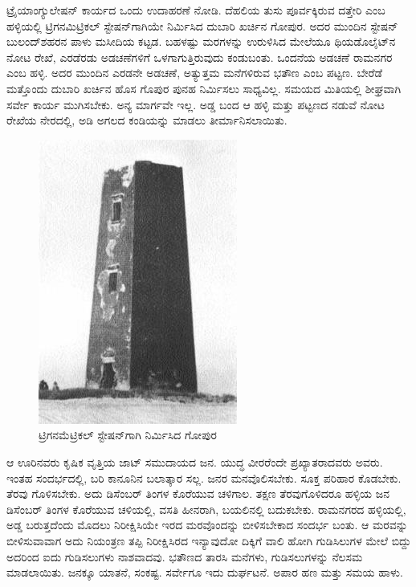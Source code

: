 ಟ್ರೈಯಾಂಗ್ಯುಲೇಷನ್​ ಕಾರ್ಯದ ಒಂದು ಉದಾಹರಣೆ ನೋಡಿ. ದೆಹಲಿಯ ತುಸು ಪೂರ್ವಕ್ಕಿರುವ ದತ್ತೇರಿ ಎಂಬ ಹಳ್ಳಿಯಲ್ಲಿ ಟ್ರಿಗನಮಿಟ್ರಿಕಲ್​ ಸ್ಟೇಷನ್​ಗಾಗಿಯೇ ನಿರ್ಮಿಸಿದ ದುಬಾರಿ ಖರ್ಚಿನ ಗೋಪುರ. ಅದರ ಮುಂದಿನ ಸ್ಟೇಷನ್​ ಬುಲಂದ್​ಶಹರನ ಪಾಳು ಮಸೀದಿಯ ಕಟ್ಟಡ. ಬಹಳಷ್ಟು ಮರಗಳನ್ನು ಉರುಳಿಸಿದ ಮೇಲೆಯೂ ಥಿಯಡೊಲೈಟ್​ನ ನೋಟ ರೇಖೆ, ಎರಡೆರಡು ಅಡಚಣೆಗಳಿಗೆ ಒಳಗಾಗುತ್ತಿರುವುದು ಕಂಡುಬಂತು. ಒಂದನೆಯ ಅಡಚಣೆ ರಾಮನಗರ ಎಂಬ ಹಳ್ಳಿ. ಅದರ ಮುಂದಿನ ಎರಡನೇ ಅಡಚಣೆ, ಅತ್ಯುತ್ತಮ ಮನೆಗಳಿರುವ ಭತೌಣ ಎಂಬ ಪಟ್ಟಣ. ಬೇರೆಡೆ ಮತ್ತೊಂದು ದುಬಾರಿ ಖರ್ಚಿನ ಹೊಸ ಗೊಪುರ ಪುನಹ ನಿರ್ಮಿಸಲು ಸಾಧ್ಯವಿಲ್ಲ. ಸಮಯದ ಮಿತಿಯಲ್ಲಿ ಶೀಘ್ರವಾಗಿ ಸರ್ವೇ ಕಾರ್ಯ ಮುಗಿಸಬೇಕು. ಅನ್ಯ ಮಾರ್ಗವೇ ಇಲ್ಲ. ಅಡ್ಡ ಬಂದ ಆ ಹಳ್ಳಿ ಮತ್ತು ಪಟ್ಟಣದ ನಡುವೆ ನೋಟ ರೇಖೆಯ ನೇರದಲ್ಲಿ,  ಅಡಿ ಅಗಲದ ಕಂಡಿಯನ್ನು ಮಾಡಲು ತೀರ್ಮಾನಿಸಲಾಯಿತು.

\begin{figure}[!htbp]
\includegraphics{"images/image015.jpg"}
\caption{ಟ್ರಿಗನಮೆಟ್ರಿಕಲ್ ಸ್ಟೇಷನ್‌ಗಾಗಿ ನಿರ್ಮಿಸಿದ ಗೋಪುರ}\label{chap12-fig1}
\end{figure}

\vskip 4pt

ಆ ಊರಿನವರು ಕೃಷಿಕ ವೃತ್ತಿಯ ಜಾಟ್​ ಸಮುದಾಯದ ಜನ. ಯುದ್ಧ ವೀರರೆಂದೇ ಪ್ರಖ್ಯಾತರಾದವರು ಅವರು. ಇಂತಹ ಸಂದರ್ಭದಲ್ಲಿ, ಬರಿ ಕಾನೂನಿನ ಬಲಾತ್ಕಾರ ಸಲ್ಲ. ಜನರ ಮನವೊಲಿಸಬೇಕು. ಸೂಕ್ತ ಪರಿಹಾರ ಕೊಡಬೇಕು. ತೆರವು ಗೊಳಿಸಬೇಕು. ಅದು ಡಿಸೆಂಬರ್​ ತಿಂಗಳ ಕೊರೆಯುವ ಚಳಿಗಾಲ. ತಕ್ಷಣ ತೆರವುಗೊಳಿದರೂ ಹಳ್ಳಿಯ ಜನ ಡಿಸೆಂಬರ್​ ತಿಂಗಳ ಕೊರೆಯುವ ಚಳಿಯಲ್ಲಿ, ವಸತಿ ಹೀನರಾಗಿ, ಬಯಲಿನಲ್ಲಿ ಬದುಕಬೇಕು. ರಾಮನಗರದ ಹಳ್ಳಿಯಲ್ಲಿ, ಅಡ್ಡ ಬರುತ್ತದೆಂದು ಮೊದಲು ನಿರೀಕ್ಷಿಸಿಯೇ ಇರದ ಮರವೊಂದನ್ನು ಬೀಳಿಸಬೇಕಾದ ಸಂದರ್ಭ ಬಂತು. ಆ ಮರವನ್ನು ಬೀಳಿಸುವಾವಾಗ ಅದು ನಿಯಂತ್ರಣ ತಪ್ಪಿ ನಿರೀಕ್ಷಿಸಿರದ ಇನ್ಯಾವುದೋ ದಿಕ್ಕಿಗೆ ವಾಲಿ ಹೋಗಿ ಗುಡಿಸಿಲುಗಳ ಮೇಲೆ ಬಿದ್ದು ಅದರಿಂದ ಐದು ಗುಡಿಸಲುಗಳು ನಾಶವಾದವು. ಭತೌಣದ  ತಾರಸಿ ಮನೆಗಳು,  ಗುಡಿಸಲುಗಳನ್ನು ನೆಲಸಮ ಮಾಡಲಾಯಿತು. ಜನಕ್ಕೂ ಯಾತನೆ, ಸಂಕಷ್ಟ. ಸರ್ವೇಗೂ ಇದು ದುರ್ಘಟನೆ. ಅಪಾರ ಹಣ ಮತ್ತು ಸಮಯ ಹಾಳು.

